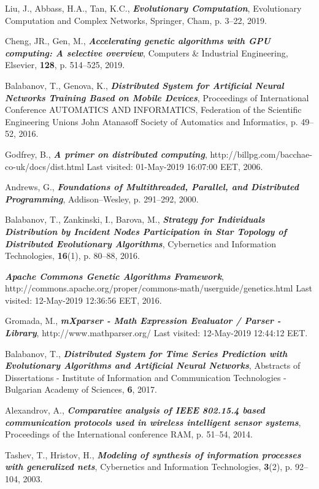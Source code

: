 \documentclass[graybox]{svmult}
\begin{document}
\begin{thebibliography}{99}
 Liu, J., Abbass, H.A., Tan, K.C., \textbf{\textit{Evolutionary Computation}}, Evolutionary Computation and Complex Networks, Springer, Cham, p. 3--22, 2019.

 Cheng, JR., Gen, M., \textbf{\textit{Accelerating genetic algorithms with GPU computing: A selective overview}}, Computers \& Industrial Engineering, Elsevier, \textbf{128}, p. 514--525, 2019.

 Balabanov, T., Genova, K., \textbf{\textit{Distributed System for Artificial Neural Networks Training Based on Mobile Devices}}, Proceedings of International Conference AUTOMATICS AND INFORMATICS, Federation of the Scientific Engineering Unions John Atanasoff Society of Automatics and Informatics, p. 49--52, 2016.

 Godfrey, B., \textbf{\textit{A primer on distributed computing}}, http://billpg.com/bacchae-co-uk/docs/dist.html Last visited: 01-May-2019 16:07:00 EET, 2006.

 Andrews, G., \textbf{\textit{Foundations of Multithreaded, Parallel, and Distributed Programming}}, Addison–Wesley, p. 291--292, 2000.

 Balabanov, T., Zankinski, I., Barova, M., \textbf{\textit{Strategy for Individuals Distribution by Incident Nodes Participation in Star Topology of Distributed Evolutionary Algorithms}}, Cybernetics and Information Technologies, \textbf{16}(1), p. 80--88, 2016.

 \textbf{\textit{Apache Commons Genetic Algorithms Framework}}, http://commons.apache.org/proper/commons-math/userguide/genetics.html Last visited: 12-May-2019 12:36:56 EET, 2016.

 Gromada, M., \textbf{\textit{mXparser - Math Expression Evaluator / Parser - Library}}, http://www.mathparser.org/ Last visited: 12-May-2019 12:44:12 EET.

 Balabanov, T., \textbf{\textit{Distributed System for Time Series Prediction with Evolutionary Algorithms and Artificial Neural Networks}}, Abstracts of Dissertations - Institute of Information and Communication Technologies - Bulgarian Academy of Sciences, \textbf{6}, 2017.

 Alexandrov, A., \textbf{\textit{Comparative analysis of IEEE 802.15.4 based communication protocols used in wireless intelligent sensor systems}}, Proceedings of the International conference RAM, p. 51--54, 2014.

 Tashev, T., Hristov, H., \textbf{\textit{Modeling of synthesis of information processes with generalized nets}}, Cybernetics and Information Technologies, \textbf{3}(2), p. 92--104, 2003.

\end{thebibliography}
\end{document}
